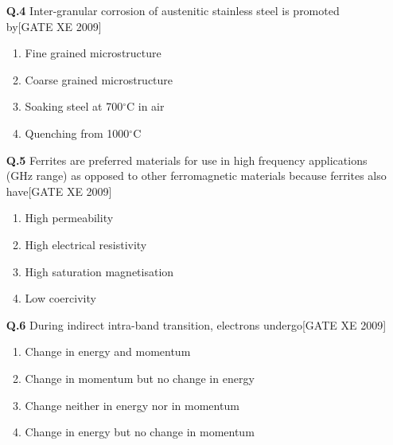 \documentclass[journal,12pt,onecolumn]{IEEEtran}
\theoremstyle{remark}
\begin{document}
\begin{enumerate}
\vspace{0.3cm}

\item[\textbf{Q.4}] Inter-granular corrosion of austenitic stainless steel is promoted by\hfill[GATE XE 2009]

\begin{multicols}{2}
\begin{enumerate}
    \item Fine grained microstructure
    \item Coarse grained microstructure
    \item Soaking steel at 700$^\circ$C in air
    \item Quenching from 1000$^\circ$C
\end{enumerate}
\end{multicols}

\vspace{0.3cm}

\item[\textbf{Q.5}] Ferrites are preferred materials for use in high frequency applications (GHz range) as opposed to other ferromagnetic materials because ferrites also have\hfill[GATE XE 2009]

\begin{multicols}{2}
\begin{enumerate}
    \item High permeability
    \item High electrical resistivity
    \item High saturation magnetisation
    \item Low coercivity
\end{enumerate}
\end{multicols}

\vspace{0.3cm}

\item[\textbf{Q.6}] During indirect intra-band transition, electrons undergo\hfill[GATE XE 2009]

\begin{multicols}{2}
\begin{enumerate}
    \item Change in energy and momentum
    \item Change in momentum but no change in energy
    \item Change neither in energy nor in momentum
    \item Change in energy but no change in momentum
\end{enumerate}
\end{multicols}


\end{enumerate}
\end{document}
